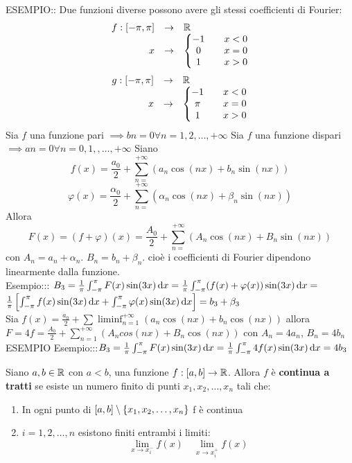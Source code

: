 ESEMPIO:: Due funzioni diverse possono avere gli stessi coefficienti di Fourier:
\[\begin{array}{rcl} f: \left[-\pi,\pi\right] & \to &  \mathbb{R} \\
x & \to & \left\{\begin{matrix} -1 && x<0\\0&&x= 0\\1&&x>0 \end{matrix}\right.\end{array}\]
\[\begin{array}{rcl} g: \left[-\pi,\pi\right] & \to &  \mathbb{R} \\
x & \to & \left\{\begin{matrix} -1 && x<0\\\pi&&x= 0\\1&&x>0 \end{matrix}\right.\end{array}\]
\observation
Sia $f$ una funzione pari $\implies bn=0 \forall n=1,2,\dotsc,+\infty$
\observation
Sia $f$ una funzione dispari $\implies an=0 \forall n=0,1,,\dotsc,+\infty$
\observation
Siano
\[f(x)=\frac{a_0}{2}+\sum\limits_{n=}^{+\infty}\left(a_n \cos(nx)+b_n \sin(nx)\right)\]
\[\varphi(x)=\frac{\alpha_0}{2}+\sum\limits_{n=}^{+\infty}\left(\alpha_n\cos(nx)+\beta_n\sin(nx)\right)\]
Allora
\[ F(x)=(f+\varphi)(x)=\frac{A_0}{2}+\sum\limits_{n=}^{+\infty}\left(A_n \cos(nx)+B_n \sin(nx)\right)\]
con $A_n=a_n+\alpha_n$. $B_n=b_n+\beta_n$.
cioè i coefficienti di Fourier dipendono linearmente dalla funzione.\\
Esempio::: $B_3=\frac{1}{\pi}\int_{-\pi}^{\pi}F(x)\sin(3x)\,\mathrm{d}{x}=\frac{1}{\pi}\int_{-\pi}^{\pi}(f(x)+\varphi(x))\sin(3x)\,\mathrm{d}{x}=$\\
$\frac{1}{\pi}\left[\int_{-\pi}^{\pi}f(x)\sin(3x)\,\mathrm{d}{x}+\int_{-\pi}^{\pi}\varphi(x)\sin(3x)\,\mathrm{d}{x}\right]=b_3+\beta_3$\\
Sia $f(x)=\frac{a_0}{2}+\sum\liminf_{n=1}^{+\infty}\left(a_n\cos(nx)+b_n\cos(nx)\right)$ allora $F=4f=\frac{A_0}{2}+\sum\limits_{n=1}^{+\infty}\left(A_ncos(nx)+B_n\cos(nx)\right)$ con $A_n=4a_n$, $B_n=4b_n$\\
ESEMPIO
Esempio:::$B_3=\frac{1}{\pi}\int_{-\pi}^{\pi}F(x)\sin(3x)\,\mathrm{d}{x}=\frac{1}{\pi}\int_{-\pi}^{\pi}4f(x)\sin(3x)\,\mathrm{d}{x}=4b_3$\\
\begin{definition}
	Siano $a,b\in \mathbb{R}$ con $a<b$, una funzione $f:\left[a,b\right] \to \mathbb{R}$. Allora $f$ è \textbf{continua a tratti} se esiste un numero finito di punti $x_1,x_2,\dotsc,x_n$ tali che:
	\begin{enumerate}
		\item In ogni punto di $\left[a,b\right]\setminus\left\{x_1,x_2,\dotsc,x_n\right\}$ f è continua
		\item $i=1,2,\dotsc,n$ esistono finiti entrambi i limiti:
		\[\lim\limits_{x\to x_i^{-}}f(x)\quad \lim\limits_{x\to x_i^{+}}f(x)\]
	\end{enumerate}
\end{definition}

